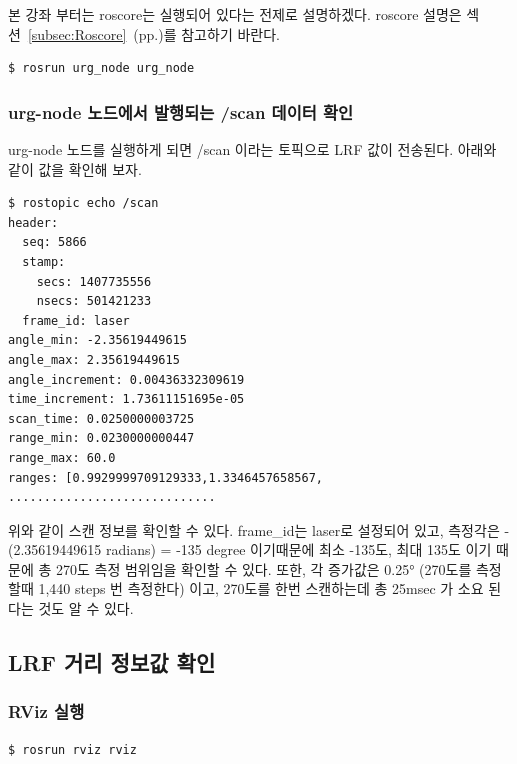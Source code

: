 본 강좌 부터는 roscore는 실행되어 있다는 전제로 설명하겠다. roscore 설명은 섹션~\ref{subsec:Roscore}~(pp.\pageref{subsec:Roscore})를 참고하기 바란다.

\begin{lstlisting}[language=ROS]
$ rosrun urg_node urg_node 
\end{lstlisting}

\subsubsection{urg-node 노드에서 발행되는 /scan 데이터 확인}

urg-node 노드를 실행하게 되면 /scan 이라는 토픽으로 LRF 값이 전송된다. 아래와 같이 값을 확인해 보자. 

\begin{lstlisting}[language=ROS]
$ rostopic echo /scan
header: 
  seq: 5866
  stamp: 
    secs: 1407735556
    nsecs: 501421233
  frame_id: laser
angle_min: -2.35619449615
angle_max: 2.35619449615
angle_increment: 0.00436332309619
time_increment: 1.73611151695e-05
scan_time: 0.0250000003725
range_min: 0.0230000000447
range_max: 60.0
ranges: [0.9929999709129333,1.3346457658567, .............................
\end{lstlisting}

위와 같이 스캔 정보를 확인할 수 있다. frame\_id는 laser로 설정되어 있고, 측정각은 -(2.35619449615 radians) = -135 degree 이기때문에 최소 -135도, 최대 135도 이기 때문에 총 270도 측정 범위임을 확인할 수 있다. 또한, 각 증가값은 0.25° (270도를 측정할때 1,440 steps 번 측정한다) 이고, 270도를 한번 스캔하는데 총 25msec 가 소요 된다는 것도 알 수 있다.

\subsection{LRF 거리 정보값 확인}

\subsubsection{RViz 실행}

\begin{lstlisting}[language=ROS]
$ rosrun rviz rviz
\end{lstlisting}

